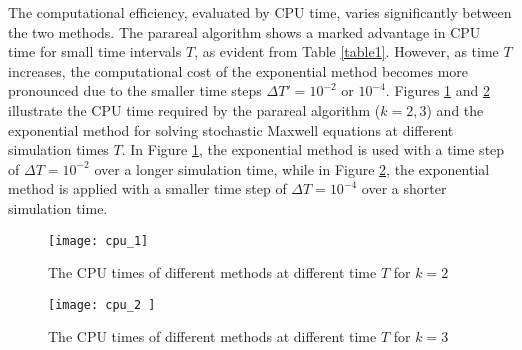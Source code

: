 \documentclass[preprint,12pt]{elsarticle}
\begin{document}
The computational efficiency, evaluated by CPU time, varies significantly between the two methods. The parareal algorithm shows a marked advantage in CPU time for small time intervals $T$, as evident from Table \ref{table1}. However, as time $T$ increases, the computational cost of the exponential method becomes more pronounced due to the smaller time steps $\Delta T' = 10^{-2}$ or $10^{-4}$. Figures \ref{fig6} and \ref{fig7} illustrate the CPU time required by the parareal algorithm (\(k = 2, 3\)) and the exponential method for solving stochastic Maxwell equations at different simulation times \(T\). In Figure \ref{fig6}, the exponential method is used with a time step of \(\Delta T = 10^{-2}\) over a longer simulation time, while in Figure \ref{fig7}, the exponential method is applied with a smaller time step of \(\Delta T = 10^{-4}\) over a shorter simulation time.

\begin{figure}[htbp]
	\centerline{\texttt{[image: cpu\_1]}}
	\vspace*{8pt}
	\caption{The CPU times of different methods at different time $T$ for $k=2$}
	\label{fig6}
\end{figure}

\begin{figure}[htbp]
	\centerline{\texttt{[image: cpu\_2 ]}}
	\vspace*{8pt}
	\caption{The CPU times of different methods at different time $T$ for $k=3$}
	\label{fig7}
\end{figure}
\end{document}

